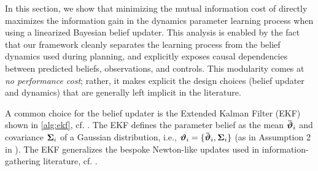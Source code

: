 In this section, we show that minimizing the mutual information cost of  directly maximizes the information gain in the dynamics parameter learning process when using a linearized Bayesian belief updater.
This analysis is enabled by the fact that our framework cleanly separates the learning process from the belief dynamics used during planning, and explicitly exposes causal dependencies between predicted beliefs, observations, and controls. 
This modularity comes at \emph{no performance cost}; rather, it  makes explicit the design choices (belief updater and dynamics) that are generally left implicit in the literature.

A common choice for the belief updater is the Extended Kalman Filter (EKF) shown in \cref{alg:ekf}, cf. \cite{thrun2002probabilistic,ljung1979asymptotic, goodwin2014adaptive}. 
The EKF defines the parameter belief as the mean $\boldsymbol{\bar{\boldsymbol{{\vartheta}}}}_i$ and covariance $\boldsymbol{\boldsymbol{\Sigma}}_i$ of a Gaussian distribution, i.e., $\boldsymbol{{\vartheta}}_i = \{\boldsymbol{\bar{\boldsymbol{{\vartheta}}}}_i, \boldsymbol{\boldsymbol{\Sigma}}_i\}$ (as in Assumption 2 in ).
The EKF generalizes \cite{howell2025optimization,ollivier2018online} the bespoke Newton-like updates used in information-gathering literature, cf. \cite{davydov2024first,lew2022safe,harrison2024variational,harrison2020meta,hu2024active}. 


